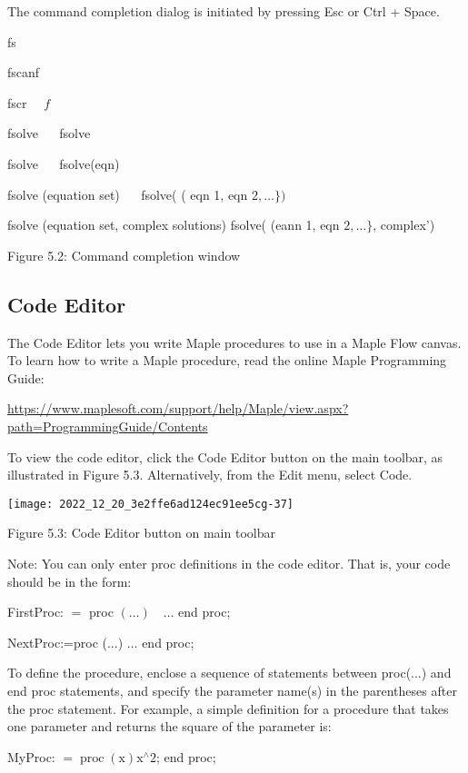 The command completion dialog is initiated by pressing Esc or Ctrl + Space.

fs

fscanf

fscr $\quad f$

fsolve $\quad$ fsolve

fsolve $\quad$ fsolve(eqn)

fsolve (equation set) $\quad$ fsolve( ( eqn 1, eqn $2, \ldots\})$

fsolve (equation set, complex solutions) fsolve( (eann 1, eqn $2, \ldots\}$, complex')

Figure 5.2: Command completion window

\subsection{Code Editor}
The Code Editor lets you write Maple procedures to use in a Maple Flow canvas. To learn how to write a Maple procedure, read the online Maple Programming Guide:

\href{https://www.maplesoft.com/support/help/Maple/view.aspx?path=ProgrammingGuide/Contents}{https://www.maplesoft.com/support/help/Maple/view.aspx?path=ProgrammingGuide/Contents}

To view the code editor, click the Code Editor button on the main toolbar, as illustrated in Figure 5.3. Alternatively, from the Edit menu, select Code.

\begin{center}
\texttt{[image: 2022\_12\_20\_3e2ffe6ad124ec91ee5cg-37]}
\end{center}

Figure 5.3: Code Editor button on main toolbar

Note: You can only enter proc definitions in the code editor. That is, your code should be in the form:

FirstProc: $=$ proc $(\ldots) \quad \ldots$ end proc;

NextProc:=proc (...) $\ldots$ end proc;

To define the procedure, enclose a sequence of statements between proc(...) and end proc statements, and specify the parameter name(s) in the parentheses after the proc statement. For example, a simple definition for a procedure that takes one parameter and returns the square of the parameter is:

MyProc: $=\operatorname{proc}(\mathrm{x}) \mathrm{x}^{\wedge} 2$; end proc;

